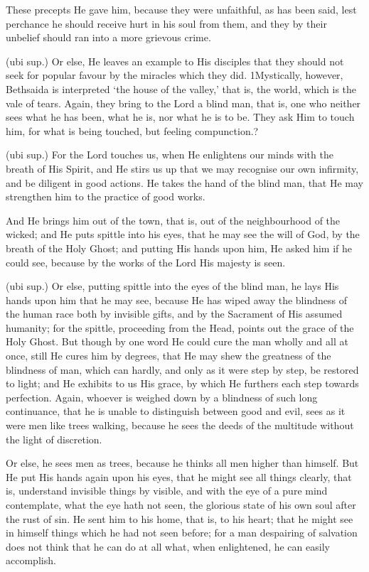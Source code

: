  These precepts He gave him, because they were unfaithful, as has been said, lest perchance he should receive hurt in his soul from them, and they by their unbelief should ran into a more grievous crime.

 (ubi sup.) Or else, He leaves an example to His disciples that they should not seek for popular favour by the miracles which they did. 1Mystically, however, Bethsaida is interpreted ‘the house of the valley,’ that is, the world, which is the vale of tears. Again, they bring to the Lord a blind man, that is, one who neither sees what he has been, what he is, nor what he is to be. They ask Him to touch him, for what is being touched, but feeling compunction.?

 (ubi sup.) For the Lord touches us, when He enlightens our minds with the breath of His Spirit, and He stirs us up that we may recognise our own infirmity, and be diligent in good actions. He takes the hand of the blind man, that He may strengthen him to the practice of good works.

 And He brings him out of the town, that is, out of the neighbourhood of the wicked; and He puts spittle into his eyes, that he may see the will of God, by the breath of the Holy Ghost; and putting His hands upon him, He asked him if he could see, because by the works of the Lord His majesty is seen.

 (ubi sup.) Or else, putting spittle into the eyes of the blind man, he lays His hands upon him that he may see, because He has wiped away the blindness of the human race both by invisible gifts, and by the Sacrament of His assumed humanity; for the spittle, proceeding from the Head, points out the grace of the Holy Ghost. But though by one word He could cure the man wholly and all at once, still He cures him by degrees, that He may shew the greatness of the blindness of man, which can hardly, and only as it were step by step, be restored to light; and He exhibits to us His grace, by which He furthers each step towards perfection. Again, whoever is weighed down by a blindness of such long continuance, that he is unable to distinguish between good and evil, sees as it were men like trees walking, because he sees the deeds of the multitude without the light of discretion.

 Or else, he sees men as trees, because he thinks all men higher than himself. But He put His hands again upon his eyes, that he might see all things clearly, that is, understand invisible things by visible, and with the eye of a pure mind contemplate, what the eye hath not seen, the glorious state of his own soul after the rust of sin. He sent him to his home, that is, to his heart; that he might see in himself things which he had not seen before; for a man despairing of salvation does not think that he can do at all what, when enlightened, he can easily accomplish.


